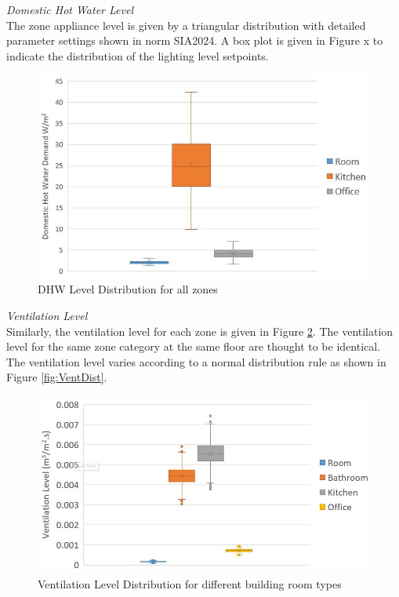 \documentclass[a4paper, oneside]{discothesis}
\begin{document}
		\textit{Domestic Hot Water Level}\\
			The zone appliance level is given by a triangular distribution with detailed parameter settings shown in norm SIA2024. A box plot is given in Figure x to indicate the distribution of the lighting level setpoints.\\


			\begin{figure}[h!]
			\centering
			\includegraphics[scale=0.7]{figures/DHWLevelDistribution.jpg}
			\caption{DHW Level Distribution for all zones}
			\label{fig:DHWDistribution}
			\end{figure}
		


		\textit{Ventilation Level}\\
			Similarly, the ventilation level for each zone is given in Figure \ref{fig:VentLevel}. The ventilation level for the same zone category at the same floor are thought to be identical. The ventilation level varies according to a normal distribution rule as shown in Figure \ref{fig:VentDist}.\\

			\begin{figure}[ht!]
			\centering
			\includegraphics[scale=0.6]{Ventilation_Level.jpg}
			\caption{Ventilation Level Distribution for different building room types}
			\label{fig:VentLevel}
			\end{figure}
\end{document}
